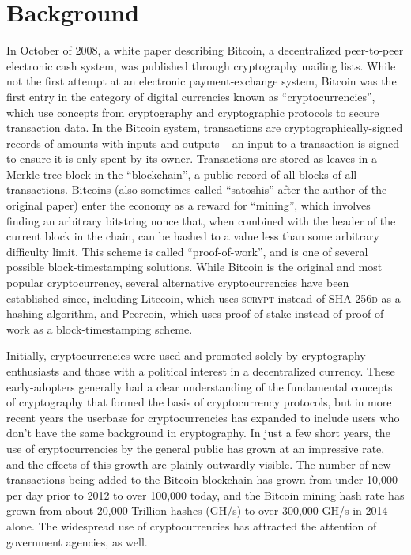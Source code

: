 \documentclass[12pt]{article}
\begin{document}
\section{Background}
In October of 2008, a white paper\cite{nakamoto:bitcoin} describing Bitcoin, a decentralized peer-to-peer electronic cash system, was published through cryptography mailing lists. While not the first attempt at an electronic payment-exchange system, Bitcoin was the first entry in the category of digital currencies known as ``cryptocurrencies'', which use concepts from cryptography and cryptographic protocols to secure transaction data. In the Bitcoin system, transactions are cryptographically-signed records of amounts with inputs and outputs -- an input to a transaction is signed to ensure it is only spent by its owner. Transactions are stored as leaves in a Merkle-tree block in the ``blockchain'', a public record of all blocks of all transactions. Bitcoins (also sometimes called ``satoshis'' after the author of the original paper) enter the economy as a reward for ``mining'', which involves finding an arbitrary bitstring nonce that, when combined with the header of the current block in the chain, can be hashed to a value less than some arbitrary difficulty limit. This scheme is called ``proof-of-work'', and is one of several possible block-timestamping solutions. While Bitcoin is the original and most popular cryptocurrency, several alternative cryptocurrencies have been established since, including Litecoin\cite{mcmillan:litecoin}, which uses \textsc{scrypt} instead of \textsc{SHA-256d} as a hashing algorithm, and Peercoin\cite{king:peercoin}, which uses proof-of-stake instead of proof-of-work as a block-timestamping scheme.

Initially, cryptocurrencies were used and promoted solely by cryptography enthusiasts\cite{slashdot:bitcoin} and those with a political interest in a decentralized currency. These early-adopters generally had a clear understanding of the fundamental concepts of cryptography that formed the basis of cryptocurrency protocols, but in more recent years the userbase for cryptocurrencies has expanded to include users who don't have the same background in cryptography. In just a few short years, the use of cryptocurrencies by the general public has grown at an impressive rate, and the effects of this growth are plainly outwardly-visible. The number of new transactions being added to the Bitcoin blockchain has grown from under 10,000 per day prior to 2012 to over 100,000 today\cite{blockchain:transactions}, and the Bitcoin mining hash rate has grown from about 20,000 Trillion hashes (GH/s) to over 300,000 GH/s in 2014 alone\cite{blockchain:hashrate}. The widespread use of cryptocurrencies has attracted the attention of government agencies\cite{irs:bitcoin}, as well.
\end{document}
